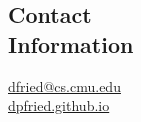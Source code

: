 \documentclass[11pt,resmargin,line]{resume}
\newcommand{\mailto}[1]{
  \href{mailto:#1}{#1}
}
\begin{document}
\begin{resume}

\section{Contact\\Information}
\mailto{dfried@cs.cmu.edu} \\
{\small \url{dpfried.github.io}}







\end{resume}
\end{document}
